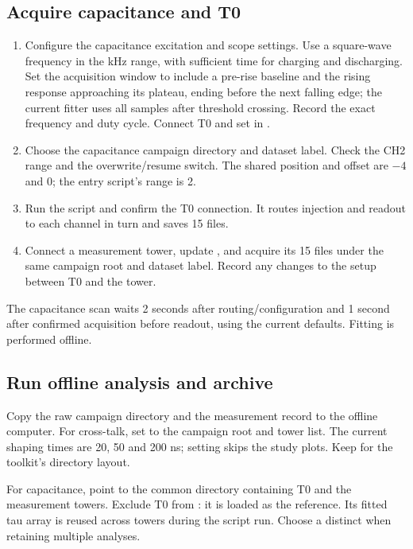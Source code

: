 \subsection{Acquire capacitance and T0}
\begin{enumerate}
\item Configure the capacitance excitation and scope settings. Use a square-wave frequency in the kHz range, with sufficient time for charging and discharging. Set the acquisition window to include a pre-rise baseline and the rising response approaching its plateau, ending before the next falling edge; the current fitter uses all samples after threshold crossing. Record the exact frequency and duty cycle. Connect T0 and set  in .
\item Choose the capacitance campaign directory and dataset label. Check the CH2 range and the overwrite/resume switch. The shared position and offset are $-4$ and 0; the entry script's range is 2.
\item Run the script and confirm the T0 connection. It routes injection and readout to each channel in turn and saves 15 files.
\item Connect a measurement tower, update , and acquire its 15 files under the same campaign root and dataset label. Record any changes to the setup between T0 and the tower.
\end{enumerate}
The capacitance scan waits 2 seconds after routing/configuration and 1 second after confirmed acquisition before readout, using the current defaults. Fitting is performed offline.

\subsection{Run offline analysis and archive}
Copy the raw campaign directory and the measurement record to the offline computer. For cross-talk, set  to the campaign root and tower list. The current shaping times are 20, 50 and 200 ns; setting  skips the study plots. Keep  for the toolkit's directory layout.

For capacitance, point  to the common directory containing T0 and the measurement towers. Exclude T0 from : it is loaded as the reference. Its fitted tau array is reused across towers during the script run. Choose a distinct  when retaining multiple analyses.

